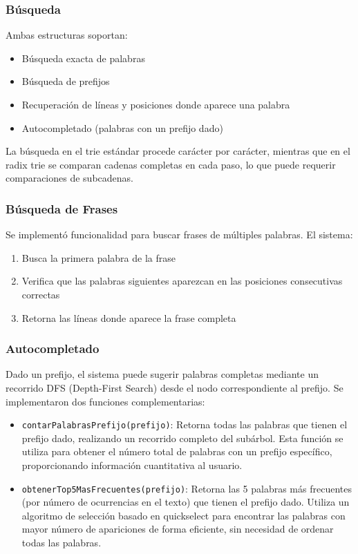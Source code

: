 \documentclass[11pt,a4paper]{article}
\begin{document}
\subsubsection{Búsqueda}

Ambas estructuras soportan:
\begin{itemize}
    \item Búsqueda exacta de palabras
    \item Búsqueda de prefijos
    \item Recuperación de líneas y posiciones donde aparece una palabra
    \item Autocompletado (palabras con un prefijo dado)
\end{itemize}

La búsqueda en el trie estándar procede carácter por carácter, mientras que en el radix trie se comparan cadenas completas en cada paso, lo que puede requerir comparaciones de subcadenas.

\subsubsection{Búsqueda de Frases}

Se implementó funcionalidad para buscar frases de múltiples palabras. El sistema:
\begin{enumerate}
    \item Busca la primera palabra de la frase
    \item Verifica que las palabras siguientes aparezcan en las posiciones consecutivas correctas
    \item Retorna las líneas donde aparece la frase completa
\end{enumerate}

\subsubsection{Autocompletado}

Dado un prefijo, el sistema puede sugerir palabras completas mediante un recorrido DFS (Depth-First Search) desde el nodo correspondiente al prefijo. Se implementaron dos funciones complementarias:

\begin{itemize}
    \item \texttt{contarPalabrasPrefijo(prefijo)}: Retorna todas las palabras que tienen el prefijo dado, realizando un recorrido completo del subárbol. Esta función se utiliza para obtener el número total de palabras con un prefijo específico, proporcionando información cuantitativa al usuario.
    
    \item \texttt{obtenerTop5MasFrecuentes(prefijo)}: Retorna las 5 palabras más frecuentes (por número de ocurrencias en el texto) que tienen el prefijo dado. Utiliza un algoritmo de selección basado en quickselect para encontrar las palabras con mayor número de apariciones de forma eficiente, sin necesidad de ordenar todas las palabras.
\end{itemize}
\end{document}

